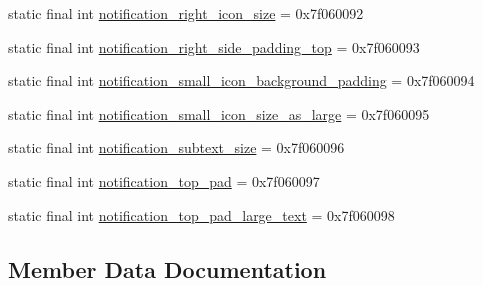 \begin{DoxyCompactItemize}
\item 
static final int \mbox{\hyperlink{classandroid_1_1support_1_1v7_1_1recyclerview_1_1R_1_1dimen_ad2231ee1cb2a7c7d222b01fdcdf21d53}{notification\+\_\+right\+\_\+icon\+\_\+size}} = 0x7f060092
\item 
static final int \mbox{\hyperlink{classandroid_1_1support_1_1v7_1_1recyclerview_1_1R_1_1dimen_a10fca1bb823d527ef88180368bfd1fe3}{notification\+\_\+right\+\_\+side\+\_\+padding\+\_\+top}} = 0x7f060093
\item 
static final int \mbox{\hyperlink{classandroid_1_1support_1_1v7_1_1recyclerview_1_1R_1_1dimen_ad5be1a4f374ad8f418c30ad8617f2da4}{notification\+\_\+small\+\_\+icon\+\_\+background\+\_\+padding}} = 0x7f060094
\item 
static final int \mbox{\hyperlink{classandroid_1_1support_1_1v7_1_1recyclerview_1_1R_1_1dimen_afa8bf9c44e5c4c2dc525df28ebbfd954}{notification\+\_\+small\+\_\+icon\+\_\+size\+\_\+as\+\_\+large}} = 0x7f060095
\item 
static final int \mbox{\hyperlink{classandroid_1_1support_1_1v7_1_1recyclerview_1_1R_1_1dimen_a4d68a0774b279ed0669648dc6b60ff5c}{notification\+\_\+subtext\+\_\+size}} = 0x7f060096
\item 
static final int \mbox{\hyperlink{classandroid_1_1support_1_1v7_1_1recyclerview_1_1R_1_1dimen_a4063e3fc0ff4315f66c6115a2a18fca6}{notification\+\_\+top\+\_\+pad}} = 0x7f060097
\item 
static final int \mbox{\hyperlink{classandroid_1_1support_1_1v7_1_1recyclerview_1_1R_1_1dimen_a10e60729bcb5e62df2e95ff21a1f777e}{notification\+\_\+top\+\_\+pad\+\_\+large\+\_\+text}} = 0x7f060098
\end{DoxyCompactItemize}


\subsection{Member Data Documentation}
\mbox{\label{classandroid_1_1support_1_1v7_1_1recyclerview_1_1R_1_1dimen_a242057186bc8580665bf783a2675ee16}} 
